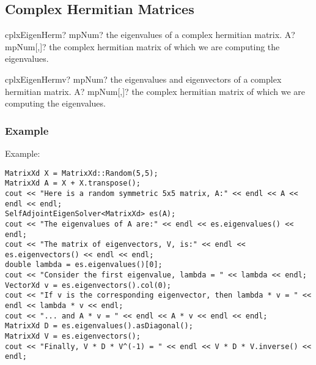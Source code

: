 


\subsection{Complex Hermitian Matrices}


\begin{mpFunctionsExtract}
	\mpFunctionOne
	{cplxEigenHerm? mpNum? the eigenvalues of a complex hermitian matrix.}
	{A? mpNum[,]? the complex hermitian  matrix of which we are computing the eigenvalues.}
\end{mpFunctionsExtract}

\vspace{0.6cm}
\begin{mpFunctionsExtract}
	\mpFunctionOne
	{cplxEigenHermv? mpNum? the eigenvalues and eigenvectors of a complex hermitian matrix.}
	{A? mpNum[,]? the complex hermitian  matrix of which we are computing the eigenvalues.}
\end{mpFunctionsExtract}


%

\subsubsection{Example}

Example:
\begin{lstlisting}
MatrixXd X = MatrixXd::Random(5,5);
MatrixXd A = X + X.transpose();
cout << "Here is a random symmetric 5x5 matrix, A:" << endl << A << endl << endl;
SelfAdjointEigenSolver<MatrixXd> es(A);
cout << "The eigenvalues of A are:" << endl << es.eigenvalues() << endl;
cout << "The matrix of eigenvectors, V, is:" << endl << es.eigenvectors() << endl << endl;
double lambda = es.eigenvalues()[0];
cout << "Consider the first eigenvalue, lambda = " << lambda << endl;
VectorXd v = es.eigenvectors().col(0);
cout << "If v is the corresponding eigenvector, then lambda * v = " << endl << lambda * v << endl;
cout << "... and A * v = " << endl << A * v << endl << endl;
MatrixXd D = es.eigenvalues().asDiagonal();
MatrixXd V = es.eigenvectors();
cout << "Finally, V * D * V^(-1) = " << endl << V * D * V.inverse() << endl;
\end{lstlisting}

